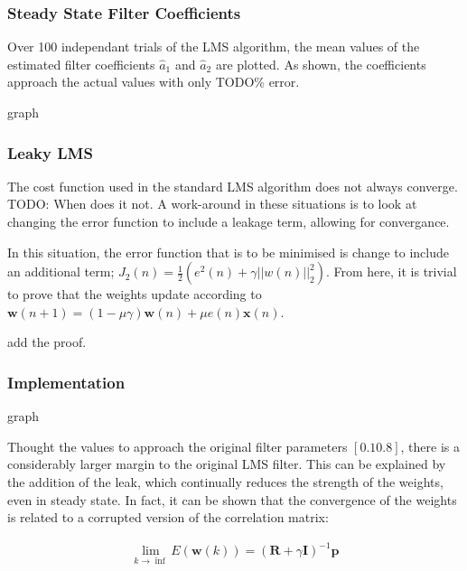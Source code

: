 \documentclass[main.tex]{subfiles}
\begin{document}
\subsubsection{Steady State Filter Coefficients}

Over 100 independant trials of the LMS algorithm, the mean values of the estimated filter coefficients $\hat{a}_1$ and $\hat{a}_2$ are plotted. As shown, the coefficients approach the actual values with only TODO\% error. 

graph










\subsubsection{Leaky LMS}

The cost function used in the standard LMS algorithm does not always converge. TODO: When does it not. A work-around in these situations is to look at changing the error function to include a leakage term, allowing for convergance. 

In this situation, the error function that is to be minimised is change to include an additional term; $J_2(n) = \frac{1}{2}(e^2(n) + \gamma||w(n)||^2_2)$. From here, it is trivial to prove that the weights update according to $\textbf{w}(n+1) = (1-\mu \gamma)\textbf{w}(n) + \mu e(n)\textbf{x}(n)$.

add the proof.








\subsubsection{Implementation}

graph

Thought the values to approach the original filter parameters $[0.1 0.8]$, there is a considerably larger margin to the original LMS filter. This can be explained by the addition of the leak, which continually reduces the strength of the weights, even in steady state. In fact, it can be shown that the convergence of the weights is related to a corrupted version of the correlation matrix\cite{Kamenetsky2004}:

\begin{align*}
\lim_{k \to \inf}E(\textbf{w}(k)) = (\textbf{R} + \gamma \textbf{I})^{-1}\textbf{p}
\end{align*}
\end{document}
